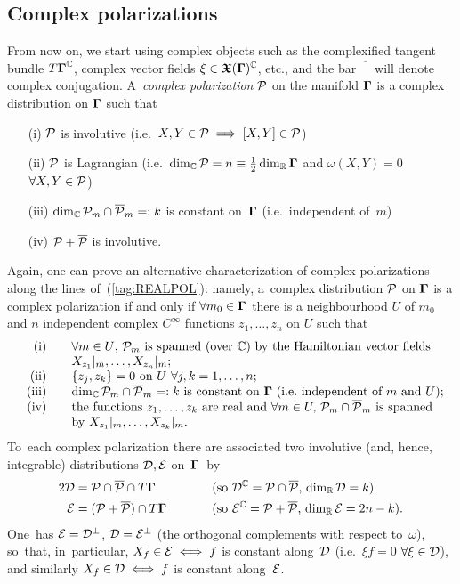 \documentclass[11pt]{amsart}
\numberwithin{equation}{section}
\theoremstyle{remark}
\newcommand\Omg{{\bigam}}   %
\newcommand\PP{{\Cal P}}
\newcommand\DD{{\Cal D}}
\newcommand\EE{{\Cal E}}
\newcommand\RR{\mathbb R}
\newcommand{\CC}{\C}
\newcommand{\bigam}{\mbox{\boldmath $\Gamma$}}
\newcommand{\bfrakX}{\mbox{\boldmath $\mathfrak X$}}
\newcommand{\C}{\mathbb C}
\begin{document}
\subsection{Complex polarizations}\label{sec23}
From now on, we start using complex objects such as the complexified tangent
bundle $T\Omg^\CC$, complex vector fields $\xi\in \bfrakX(\Omg)^\CC$, etc., and
the bar $\overline{\phantom X}$ will denote complex conjugation. A~{\sl complex
polarization\/} $\PP$ on the manifold $\Omg$ is a complex distribution on
$\Omg$ such that \begin{enumerate}
\item[(i)] $\PP$ is involutive (i.e.~$X,Y\in\PP\implies[X,Y]\in\PP$)
\item[(ii)] $\PP$ is Lagrangian (i.e.~$\dim_\CC\PP=n\equiv\tfrac12\dim_\RR\Omg$
and $\omega(X,Y)=0$ $\forall X,Y\in\PP$)
\item[(iii)] $\dim_\CC \PP_m\cap\overline\PP_m=:k$ is constant on~$\Omg$
(i.e.~independent of~$m$)
\item[(iv)] $\PP+\overline\PP$ is involutive.  \end{enumerate}
Again, one can prove an alternative characterization of complex polarizations
along the lines of~(\ref{tag:REALPOL}): namely, a~complex distribution $\PP$ on
$\Omg$ is a complex polarization if and only if $\forall m_0\in \Omg$ there is
a neighbourhood $U$ of $m_0$ and $n$ independent complex $C^\infty$ functions
$z_1,\dots,z_n$ on $U$ such that
\begin{equation}   \begin{array}{rl}
\text{(i) }&\text{$\forall m\in U$, $\PP_m$ is spanned (over~$\CC$) by the
Hamiltonian vector fields}\\
&\text{$X_{z_1}|_m,\dots,X_{z_n}|_m$;} \\
\text{(ii) }&\text{$\{z_j,z_k\}=0$ on $U$ $\forall j,k=1,\dots,n$;} \\
\text{(iii) }&\text{$\dim_\CC \PP_m\cap\overline\PP_m=:k$ is constant on~$\Omg$
(i.e.~independent of~$m$ and~$U$);} \\
\text{(iv) }&\text{the functions $z_1,\dots,z_k$ are real and $\forall m\in U,$
$\PP_m\cap\overline\PP_m$ is spanned} \\
&\text{by $X_{z_1}|_m,\dots,X_{z_k}|_m$.}
\end{array}   \label{tag:CPLXPOL}  \end{equation}
To~each complex polarization there are associated two 
involutive (and, hence, integrable) distributions $\DD,\EE$ on~$\Omg$~by
\begin{alignat*} 2
\DD &= \PP\cap\overline\PP\cap T\Omg \qquad &&\text{(so
$\DD^\CC=\PP\cap\overline\PP$, $\dim_\RR\DD=k$)} \\
\EE &= (\PP+\overline\PP)\cap T\Omg \qquad &&\text{(so
$\EE^\CC=\PP+\overline\PP$, $\dim_\RR\EE=2n-k$)}.  \end{alignat*}
One~has $\EE=\DD^\perp$, $\DD=\EE^\perp$ (the orthogonal complements with
respect to~$\omega$), so~that, in~particular, $X_f\in\EE\iff f$ is constant
along~$\DD$ (i.e.~$\xi f=0$ $\forall\xi\in\DD$), and similarly $X_f\in\DD\iff
f$ is constant along~$\EE$.
\end{document}
